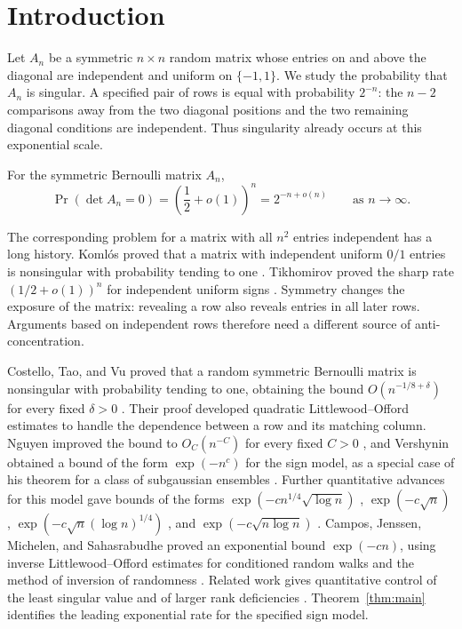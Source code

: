 \section{Introduction}\label{sec:introduction}

Let \(A_n\) be a symmetric \(n\times n\) random matrix whose entries
on and above the diagonal are independent and uniform on \(\{-1,1\}\).
We study the probability that \(A_n\) is singular. A specified pair of
rows is equal with probability \(2^{-n}\): the \(n-2\) comparisons away
from the two diagonal positions and the two remaining diagonal
conditions are independent. Thus singularity already occurs at this
exponential scale.

\begin{theorem}\label{thm:main}
For the symmetric Bernoulli matrix \(A_n\),
\[
 \Pr(\det A_n=0)=\left(\frac12+o(1)\right)^n
                =2^{-n+o(n)}
 \qquad\text{as }n\to\infty.
\]
\end{theorem}

The corresponding problem for a matrix with all \(n^2\) entries
independent has a long history. Koml\'os proved that a matrix with
independent uniform \(0/1\) entries is nonsingular with probability
tending to one \cite{Komlos}. Tikhomirov proved the sharp rate
\((1/2+o(1))^n\) for independent uniform signs
\cite{Tikhomirov}. Symmetry changes the exposure of the matrix:
revealing a row also reveals entries in all later rows. Arguments
based on independent rows therefore need a different source of
anti-concentration.

Costello, Tao, and Vu proved that a random symmetric Bernoulli matrix
is nonsingular with probability tending to one, obtaining the bound
\(O(n^{-1/8+\delta})\) for every fixed \(\delta>0\)
\cite{CTV}. Their proof developed quadratic Littlewood--Offord
estimates to handle the dependence between a row and its matching
column. Nguyen improved the bound to \(O_C(n^{-C})\) for every fixed
\(C>0\) \cite{Nguyen}, and Vershynin obtained a bound of the form
\(\exp(-n^c)\) for the sign model, as a special case of his theorem
for a class of subgaussian ensembles \cite{Vershynin}. Further
quantitative advances for this model gave bounds
of the forms
\(\exp(-c n^{1/4}\sqrt{\log n})\) \cite{FerberJain},
\(\exp(-c\sqrt n)\) \cite{CamposMattosMorrisMorrison},
\(\exp(-c\sqrt n(\log n)^{1/4})\) \cite{JainSahSawhney}, and
\(\exp(-c\sqrt{n\log n})\) \cite{CJMSRevisited}.
Campos, Jenssen, Michelen, and Sahasrabudhe proved an exponential
bound \(\exp(-cn)\), using inverse Littlewood--Offord estimates for
conditioned random walks and the method of inversion of randomness
\cite{SymmetricExponential}. Related work gives
quantitative control of the least singular value
\cite{SymmetricLeastSingular} and of larger rank deficiencies
\cite{HanRank}. Theorem~\ref{thm:main} identifies the leading
exponential rate for the specified sign model.


